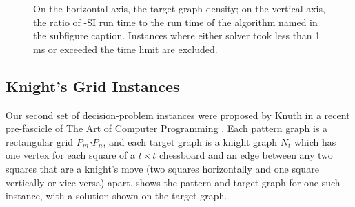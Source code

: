 \begin{figure}[htb]
    \centering
    \caption{On the horizontal axis, the target graph density; on the vertical axis, the ratio of \McSplit-SI run time to
            the run time of the algorithm named in the subfigure caption.
            Instances where either solver took less than 1 ms or exceeded the time limit are excluded.}
    \label{figure:density-runtime-ratio}
\end{figure}

\FloatBarrier

\subsection{Knight's Grid Instances}\label{subsec:si-knights-experiment}

Our second set of decision-problem instances were proposed by Knuth in a recent pre-fascicle
of The Art of Computer Programming \citep{knuth2022art}.  Each pattern graph is a rectangular grid
$P_m \square P_n$, and each target graph is a knight graph $N_t$ which has one vertex for each
square of a $t \times t$ chessboard and an edge between any two squares that are a knight's
move (two squares horizontally and one square vertically or vice versa) apart.
 shows the pattern and target graph for one such instance,
with a solution shown on the target graph.

